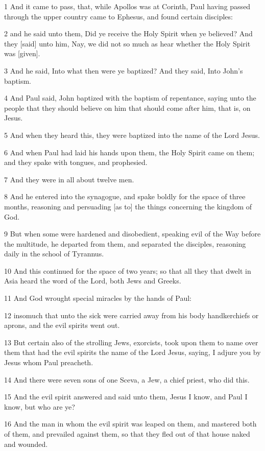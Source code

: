\par 1 And it came to pass, that, while Apollos was at Corinth, Paul having passed through the upper country came to Ephesus, and found certain disciples:
\par 2 and he said unto them, Did ye receive the Holy Spirit when ye believed? And they [said] unto him, Nay, we did not so much as hear whether the Holy Spirit was [given].
\par 3 And he said, Into what then were ye baptized? And they said, Into John's baptism.
\par 4 And Paul said, John baptized with the baptism of repentance, saying unto the people that they should believe on him that should come after him, that is, on Jesus.
\par 5 And when they heard this, they were baptized into the name of the Lord Jesus.
\par 6 And when Paul had laid his hands upon them, the Holy Spirit came on them; and they spake with tongues, and prophesied.
\par 7 And they were in all about twelve men.
\par 8 And he entered into the synagogue, and spake boldly for the space of three months, reasoning and persuading [as to] the things concerning the kingdom of God.
\par 9 But when some were hardened and disobedient, speaking evil of the Way before the multitude, he departed from them, and separated the disciples, reasoning daily in the school of Tyrannus.
\par 10 And this continued for the space of two years; so that all they that dwelt in Asia heard the word of the Lord, both Jews and Greeks.
\par 11 And God wrought special miracles by the hands of Paul:
\par 12 insomuch that unto the sick were carried away from his body handkerchiefs or aprons, and the evil spirits went out.
\par 13 But certain also of the strolling Jews, exorcists, took upon them to name over them that had the evil spirits the name of the Lord Jesus, saying, I adjure you by Jesus whom Paul preacheth.
\par 14 And there were seven sons of one Sceva, a Jew, a chief priest, who did this.
\par 15 And the evil spirit answered and said unto them, Jesus I know, and Paul I know, but who are ye?
\par 16 And the man in whom the evil spirit was leaped on them, and mastered both of them, and prevailed against them, so that they fled out of that house naked and wounded.
